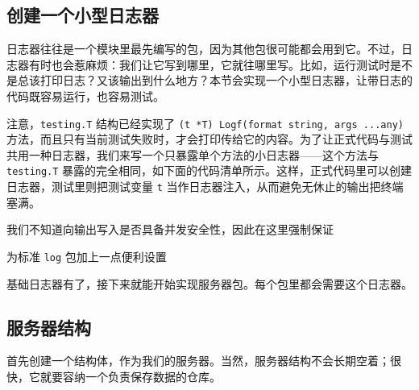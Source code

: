 \subsection{创建一个小型日志器}

日志器往往是一个模块里最先编写的包，因为其他包很可能都会用到它。不过，日志器有时也会惹麻烦：我们让它写到哪里，它就往哪里写。比如，运行测试时是不是总该打印日志？又该输出到什么地方？本节会实现一个小型日志器，让带日志的代码既容易运行，也容易测试。

注意，\texttt{testing.T} 结构已经实现了 \texttt{(t *T) Logf(format string, args ...any)} 方法，而且只有当前测试失败时，才会打印传给它的内容。为了让正式代码与测试共用一种日志器，我们来写一个只暴露单个方法的小日志器——这个方法与 \texttt{testing.T} 暴露的完全相同，如下面的代码清单所示。这样，正式代码里可以创建日志器，测试里则把测试变量 \texttt{t} 当作日志器注入，从而避免无休止的输出把终端塞满。


\begin{codeannotations}
\item 我们不知道向输出写入是否具备并发安全性，因此在这里强制保证
\item 为标准 \texttt{log} 包加上一点便利设置
\end{codeannotations}

基础日志器有了，接下来就能开始实现服务器包。每个包里都会需要这个日志器。

\subsection{服务器结构}

首先创建一个结构体，作为我们的服务器。当然，服务器结构不会长期空着；很快，它就要容纳一个负责保存数据的仓库。

